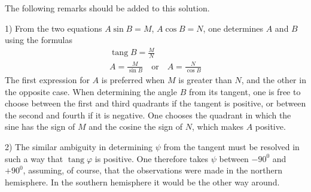 The following remarks should be added to this solution.

1) From the two equations $A\sin B=M$, $A\cos B=N$, one determines $A$ and $B$ using the formulas
\[
\begin{gathered}
\operatorname{tang}B=\frac{M}{N}\\
A=\frac{M}{\sin B}\quad\text{or}\quad A=\frac{N}{\cos B}
\end{gathered}
\]
The first expression for $A$ is preferred when $M$ is greater than $N$, and the other in the opposite case. When determining the angle $B$ from its tangent, one is free to choose between the first and third quadrants if the tangent is positive, or between the second and fourth if it is negative. One chooses the quadrant in which the sine has the sign of $M$ and the cosine the sign of $N$, which makes $A$ positive.

2) The similar ambiguity in determining $\psi$ from the tangent must be resolved in such a way that $\operatorname{tang}\varphi$ is positive. One therefore takes $\psi$ between $-90^0$ and $+90^0$, assuming, of course, that the observations were made in the northern hemisphere. In the southern hemisphere it would be the other way around.

